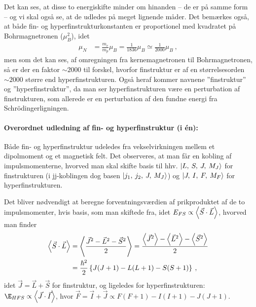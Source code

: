 Det kan ses, at disse to energiskifte minder om hinanden -- de er på samme form -- og vi skal også se, at de udledes på meget lignende måder. Det bemærkes også, at både fin- og hyperfinstrukturkonstanten er proportionel med kvadratet på Bohrmagnetronen ($\mu_B^2$), idet
\begin{align}
    \mu_N &= \frac{m_e}{m_p} \mu_B = \frac{1}{1836}\mu_B \simeq \frac{1}{2000}\mu_B \: ,
\end{align}
men som det kan ses, af omregningen fra kernemagnetronen til Bohrmagnetronen, så er der en faktor $\sim 2000$ til forskel, hvorfor finstruktur er af en størrelsesorden $\sim 2000$ større end hyperfinstrukturen. Også heraf kommer navnene ''finstruktur'' og ''hyperfinstruktur'', da man ser hyperfinstrukturen være en perturbation af finstrukturen, som allerede er en perturbation af den fundne energi fra Schrödingerligningen.\\


\paragraph{Overordnet udledning af fin- og hyperfinstruktur (i én):} Både fin- og hyperfinstruktur udeledes fra vekselvirkningen mellem et dipolmoment og et magnetisk felt. Det observeres, at man får en kobling af impulsmomenterne, hvorved man skal skifte basis til hhv. $\ket{L,\: S,\: J,\: M_J}$ for finstrukturen (i jj-koblingen dog basen $\ket{j_1,\: j_2,\: J,\: M_J}$) og $\ket{J,\: I,\: F,\: M_F}$ for hyperfinstrukturen.

Det bliver nødvendigt at beregne forventningsværdien af prikproduktet af de to impulsmomenter, hvis basis, som man skiftede fra, idet $E_{FS} \propto \Braket{\Vec{S} \cdot \Vec{L}}$, hvorved man finder
\begin{align}
    \Braket{\Vec{S} \cdot \Vec{L}} &= \Braket{\frac{\Vec{J}^2 - \Vec{L}^2 - \Vec{S}^2}{2}}
    = \frac{\Braket{\Vec{J}^2} - \Braket{\Vec{L}^2} - \Braket{\Vec{S}^2}}{2} \nonumber\\
    &= \frac{\hbar^2}{2}\left\{J(J+1) - L(L+1) - S(S+1)\right\} \: ,
\end{align}
idet $\Vec{J} = \Vec{L} + \Vec{S}$ for finstruktur, og ligeledes for hyperfinstrukturen: $\E_{HFS} \propto \braket{\Vec{J} \cdot \Vec{I}}$, hvor $\Vec{F} = \Vec{I} + \Vec{J} \propto F(F+1) - I(I+1) - J(J+1)$.